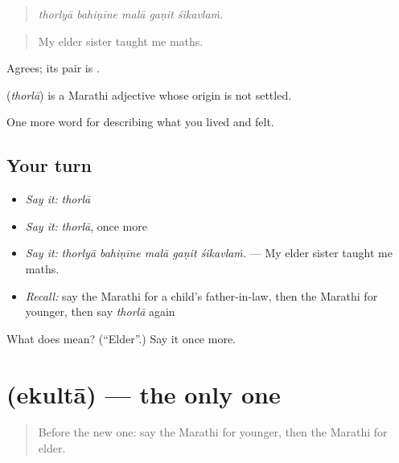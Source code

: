 \begin{quote}
\emph{thorlyā bahiṇīne malā gaṇit śikavlaṁ.}
\end{quote}

\begin{quote}
My elder sister taught me maths.
\end{quote}

Agrees; its pair is .

\begin{cousinweb}
\textbf{} (\emph{thorlā}) is a Marathi adjective whose origin is not settled.
\end{cousinweb}

\begin{grammarlens}[title={What you've built}]
One more word for describing what you lived and felt.
\end{grammarlens}

\subsection*{Your turn}
\begin{itemize}
\raggedright
  \item \emph{Say it:} \emph{thorlā}
  \item \emph{Say it:} \emph{thorlā}, once more
  \item \emph{Say it:} \emph{thorlyā bahiṇīne malā gaṇit śikavlaṁ.} — My elder sister taught me maths.
  \item \emph{Recall:} say the Marathi for a child's father-in-law, then the Marathi for younger, then say \emph{thorlā} again
\end{itemize}

\begin{tcolorbox}[breakable,colback=teal!4,colframe=teal!35!black,title={Before you move on}]
What does  mean? (\textquotedblleft{}Elder\textquotedblright{}.) Say it once more.
\end{tcolorbox}
\section[\texorpdfstring{\mr{एकुलता} (ekultā)}{एकुलता (ekultā)}]{ (ekultā) — the only one}

\label{lesson:MR-C497-ekulta}



\begin{quote}
Before the new one: say the Marathi for younger, then the Marathi for elder.
\end{quote}

